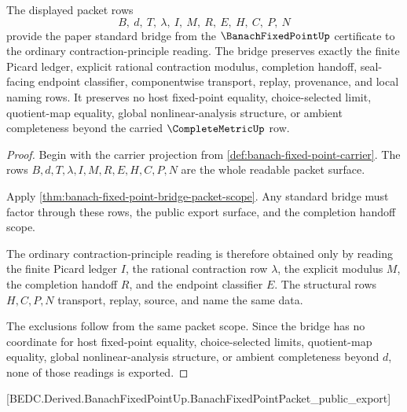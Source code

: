 \begin{theorem}
\label{thm:banach-fixed-point-std-bridge}
The displayed packet rows
$$
B,\ d,\ T,\ \lambda,\ I,\ M,\ R,\ E,\ H,\ C,\ P,\ N
$$
provide the paper standard bridge from the $\BanachFixedPointUp$ certificate to the ordinary contraction-principle reading. The bridge preserves exactly the finite Picard ledger, explicit rational contraction modulus, completion handoff, seal-facing endpoint classifier, componentwise transport, replay, provenance, and local naming rows. It preserves no host fixed-point equality, choice-selected limit, quotient-map equality, global nonlinear-analysis structure, or ambient completeness beyond the carried $\CompleteMetricUp$ row.
\end{theorem}
\begin{proof}
Begin with the carrier projection from \autoref{def:banach-fixed-point-carrier}. The rows $B,d,T,\lambda,I,M,R,E,H,C,P,N$ are the whole readable packet surface.

Apply \autoref{thm:banach-fixed-point-bridge-packet-scope}. Any standard bridge must factor through these rows, the public export surface, and the completion handoff scope.

The ordinary contraction-principle reading is therefore obtained only by reading the finite Picard ledger $I$, the rational contraction row $\lambda$, the explicit modulus $M$, the completion handoff $R$, and the endpoint classifier $E$. The structural rows $H,C,P,N$ transport, replay, source, and name the same data.

The exclusions follow from the same packet scope. Since the bridge has no coordinate for host fixed-point equality, choice-selected limits, quotient-map equality, global nonlinear-analysis structure, or ambient completeness beyond $d$, none of those readings is exported.
\end{proof}

[BEDC.Derived.BanachFixedPointUp.BanachFixedPointPacket\_public\_export]

